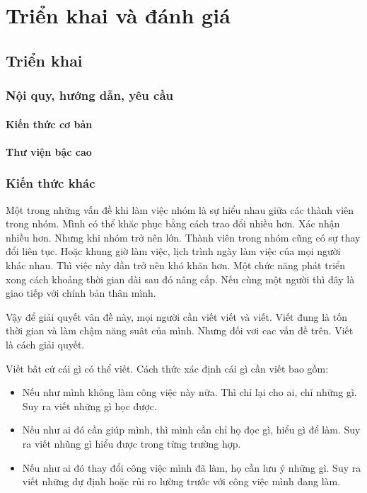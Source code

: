 
\chapter{Triển khai và đánh giá}\label{section:dev}

\section{Triển khai}
\subsection{Nội quy, hướng dẫn, yêu cầu}
\subsubsection{Kiến thức cơ bản}
\subsubsection{Thư viện bậc cao}
\subsection{Kiến thức khác}
Một trong những vấn đề khi làm việc nhóm là sự hiểu nhau giữa các thành viên trong nhóm.
Mình có thể khăc phục bằng cách trao đổi nhiều hơn. Xác nhận nhiều hơn. Nhưng khi nhóm trở nên lớn.
Thành viên trong nhóm cũng có sự thay đổi liên tục. Hoặc khung giờ làm việc, lịch trình ngày làm việc của mọi người khác nhau. Thì việc này dần trở nên khó khăn hơn. Một chức năng phát triển xong cách khoảng thời gian dài sau đó nâng cấp. Nếu cùng một người thì đây là giao tiếp với chính bản thân mình.

Vậy để giải quyết vân đề này, mọi người cần viết viết và viết. Viết đung là tốn thời gian và làm chậm năng suât của mình. Nhưng đối vơi cac vấn đề trên. Viết là cách giải quyết.

Viết bât cứ cái gì có thể viết. Cách thức xác định cái gì cần viết bao gồm:

\begin{itemize}
	\item Nếu như mình không làm công việc này nữa. Thì chỉ lại cho ai, chỉ những gì. Suy ra viết những gì học được.
	\item Nếu như ai đó cần giúp mình, thì mình cần chỉ họ đọc gì, hiểu gì để làm. Suy ra viết nhũng gì hiểu được trong từng trường hợp.
	\item Nếu như ai đó thay đổi công việc mình đã làm, họ cần lưu ý những gì. Suy ra viết những dự định hoặc rủi ro lường trước với công việc mình đang làm.
\end{itemize}



